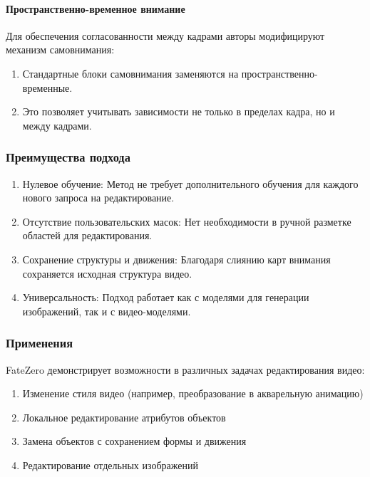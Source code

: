 \paragraph{Пространственно-временное внимание}

Для обеспечения согласованности между кадрами авторы модифицируют механизм самовнимания:

\begin{enumerate}
    \item  Стандартные блоки самовнимания заменяются на пространственно-временные.
    \item  Это позволяет учитывать зависимости не только в пределах кадра, но и между кадрами.
\end{enumerate}

\subsubsection{Преимущества подхода}

\begin{enumerate}
    \item  Нулевое обучение: Метод не требует дополнительного обучения для каждого нового запроса на редактирование.
    \item  Отсутствие пользовательских масок: Нет необходимости в ручной разметке областей для редактирования.
    \item  Сохранение структуры и движения: Благодаря слиянию карт внимания сохраняется исходная структура видео.
    \item  Универсальность: Подход работает как с моделями для генерации изображений, так и с видео-моделями.
\end{enumerate}

\subsubsection{Применения}

FateZero демонстрирует возможности в различных задачах редактирования видео:

\begin{enumerate}
    \item  Изменение стиля видео (например, преобразование в акварельную анимацию)
    \item  Локальное редактирование атрибутов объектов
    \item  Замена объектов с сохранением формы и движения
    \item  Редактирование отдельных изображений
\end{enumerate}



